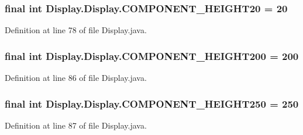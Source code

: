 \subsubsection[{C\+O\+M\+P\+O\+N\+E\+N\+T\+\_\+\+H\+E\+I\+G\+H\+T20}]{\setlength{\rightskip}{0pt plus 5cm}final int Display.\+Display.\+C\+O\+M\+P\+O\+N\+E\+N\+T\+\_\+\+H\+E\+I\+G\+H\+T20 = 20\hspace{0.3cm}{\ttfamily [static]}}\label{class_display_1_1_display_a205927f3e051ee88782c185b37c9e1d5}


Definition at line 78 of file Display.\+java.

\hypertarget{class_display_1_1_display_a880d1f86d07c77332fa8015e1b7a5145}{}
\subsubsection[{C\+O\+M\+P\+O\+N\+E\+N\+T\+\_\+\+H\+E\+I\+G\+H\+T200}]{\setlength{\rightskip}{0pt plus 5cm}final int Display.\+Display.\+C\+O\+M\+P\+O\+N\+E\+N\+T\+\_\+\+H\+E\+I\+G\+H\+T200 = 200\hspace{0.3cm}{\ttfamily [static]}}\label{class_display_1_1_display_a880d1f86d07c77332fa8015e1b7a5145}


Definition at line 86 of file Display.\+java.

\hypertarget{class_display_1_1_display_afbd2f610599f4393a4c30314c28ab73b}{}
\subsubsection[{C\+O\+M\+P\+O\+N\+E\+N\+T\+\_\+\+H\+E\+I\+G\+H\+T250}]{\setlength{\rightskip}{0pt plus 5cm}final int Display.\+Display.\+C\+O\+M\+P\+O\+N\+E\+N\+T\+\_\+\+H\+E\+I\+G\+H\+T250 = 250\hspace{0.3cm}{\ttfamily [static]}}\label{class_display_1_1_display_afbd2f610599f4393a4c30314c28ab73b}


Definition at line 87 of file Display.\+java.


